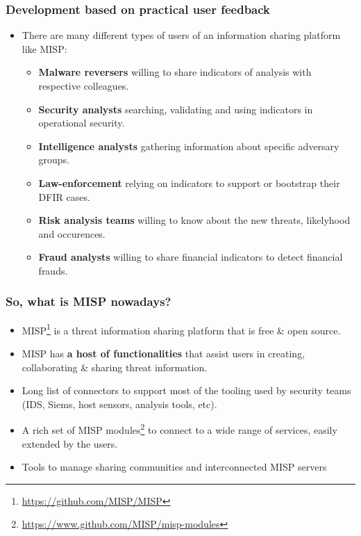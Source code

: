 \begin{frame}
\frametitle{Development based on practical user feedback}
\begin{itemize}
\item There are many different types of users of an information sharing platform like MISP:
        \begin{itemize}
                \item {\bf Malware reversers} willing to share indicators of analysis with respective colleagues.
                \item {\bf Security analysts} searching, validating and using indicators in operational security.
                \item {\bf Intelligence analysts} gathering information about specific adversary groups.
                \item {\bf Law-enforcement} relying on indicators to support or bootstrap their DFIR cases.
                \item {\bf Risk analysis teams} willing to know about the new threats, likelyhood and occurences.
                \item {\bf Fraud analysts} willing to share financial indicators to detect financial frauds.
        \end{itemize}
\end{itemize}
\end{frame}

\begin{frame}
 \frametitle{So, what is MISP nowadays?}
 \begin{itemize}
         \item MISP\footnote{\url{https://github.com/MISP/MISP}} is a threat information sharing platform that is free \& open source.
         \item MISP has {\bf a host of functionalities} that assist users in creating, collaborating \& sharing threat information.
         \item Long list of connectors to support most of the tooling used by security teams (IDS, Siems, host sensors, analysis tools, etc).
         \item A rich set of MISP modules\footnote{\url{https://www.github.com/MISP/misp-modules}} to connect to a wide range of services, easily extended by the users.
         \item Tools to manage sharing communities and interconnected MISP servers
 \end{itemize}
\end{frame}

